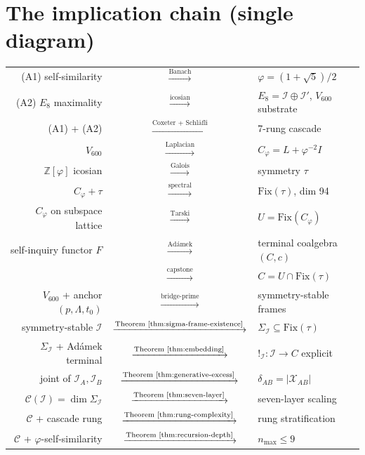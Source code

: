 \documentclass[11pt]{article}
\theoremstyle{plain}
\theoremstyle{definition}
\theoremstyle{remark}
\newcommand{\Zphi}{\mathbb{Z}[\varphi]}
\newcommand{\Ical}{\mathcal{I}}
\newcommand{\Ccal}{\mathcal{C}}
\newcommand{\Fix}{\mathrm{Fix}}
\newcommand{\Cph}{C_\varphi}
\newcommand{\Xcal}{\mathcal{X}}
\begin{document}
\appendix

\section{The implication chain (single diagram)}\label{app:chain}

\begin{center}
\renewcommand{\arraystretch}{1.25}
\begin{tabular}{rcl}
(A1) self-similarity & $\xrightarrow{\text{Banach}}$ & $\varphi = (1+\sqrt{5})/2$ \\
(A2) $E_8$ maximality & $\xrightarrow{\text{icosian}}$ & $E_8 = \Ical \oplus \Ical'$, $V_{600}$ substrate \\
(A1) + (A2) & $\xrightarrow{\text{Coxeter + Schl\"afli}}$ & 7-rung cascade \\
$V_{600}$ & $\xrightarrow{\text{Laplacian}}$ & $\Cph = L + \varphi^{-2}I$ \\
$\Zphi$ icosian & $\xrightarrow{\text{Galois}}$ & symmetry $\tau$ \\
$\Cph + \tau$ & $\xrightarrow{\text{spectral}}$ & $\Fix(\tau)$, dim 94 \\
$\Cph$ on subspace lattice & $\xrightarrow{\text{Tarski}}$ & $U = \Fix(\Cph)$ \\
self-inquiry functor $F$ & $\xrightarrow{\text{Adámek}}$ & terminal coalgebra $(C, c)$ \\
& $\xrightarrow{\text{capstone}}$ & $C = U \cap \Fix(\tau)$ \\
$V_{600}$ + anchor $(p, \Lambda, t_0)$ & $\xrightarrow{\text{bridge-prime}}$ & symmetry-stable frames \\
symmetry-stable $\Ical$ & $\xrightarrow{\text{Theorem~\ref{thm:sigma-frame-existence}}}$ & $\Sigma_\Ical \subseteq \Fix(\tau)$ \\
$\Sigma_\Ical$ + Adámek terminal & $\xrightarrow{\text{Theorem~\ref{thm:embedding}}}$ & $!_\Ical: \Ical \to C$ explicit \\
joint of $\Ical_A, \Ical_B$ & $\xrightarrow{\text{Theorem~\ref{thm:generative-excess}}}$ & $\delta_{AB} = |\Xcal_{AB}|$ \\
$\Ccal(\Ical) = \dim \Sigma_\Ical$ & $\xrightarrow{\text{Theorem~\ref{thm:seven-layer}}}$ & seven-layer scaling \\
$\Ccal$ + cascade rung & $\xrightarrow{\text{Theorem~\ref{thm:rung-complexity}}}$ & rung stratification \\
$\Ccal$ + $\varphi$-self-similarity & $\xrightarrow{\text{Theorem~\ref{thm:recursion-depth}}}$ & $n_{\max} \leq 9$ \\
\bottomrule
\end{tabular}
\end{center}
\end{document}

